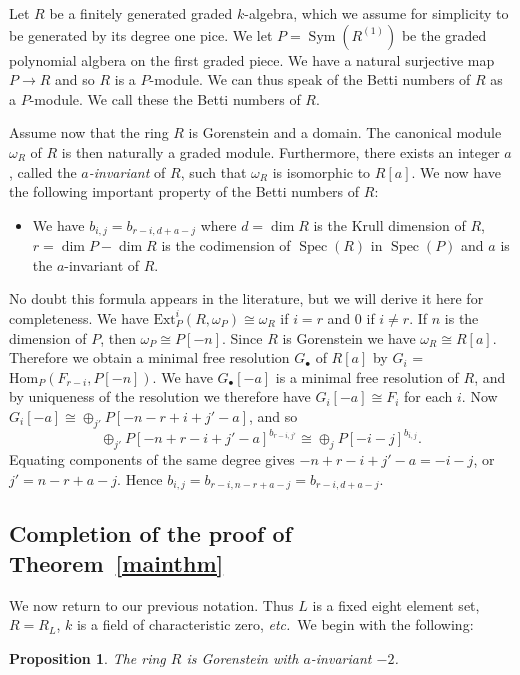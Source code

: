 \documentclass{amsart}
\newtheorem{proposition}[theorem]{Proposition}
\theoremstyle{definition}
\theoremstyle{remark}
\DeclareMathOperator{\Sym}{Sym}
\DeclareMathOperator{\Spec}{Spec}
\def\etc{{\it etc.}}
\begin{document}
Let $R$ be a finitely generated graded $k$-algebra, which we assume for
simplicity to be generated by its degree one pice.  We let $P=\Sym(R^{(1)})$
be the graded polynomial algbera on the first graded piece.  We have a
natural surjective map $P \to R$ and so $R$ is a $P$-module.  We can thus speak
of the Betti numbers of $R$ as a $P$-module.  We call these the Betti numbers
of $R$.

Assume now that the ring $R$ is Gorenstein and a domain.  The canonical module
$\omega_R$ of $R$ is then naturally a graded module.  Furthermore, there exists
an integer $a$, called the \emph{$a$-invariant} of $R$, such that $\omega_R$ is
isomorphic to $R[a]$.  We now have the following important property of the
Betti numbers of $R$:
\begin{itemize}
\item[(B6)] We have $b_{i, j}=b_{r-i, d+a-j}$ where $d=\dim{R}$ is the Krull
dimension of $R$, $r=\dim{P}-\dim{R}$ is the codimension of $\Spec(R)$ in
$\Spec(P)$ and $a$ is the $a$-invariant of $R$.
\end{itemize}
No doubt this formula appears in the literature, but we will derive it here for completeness.   
We have $\mathrm{Ext}^i_P(R, \omega_P) \cong \omega_R$ if 
$i = r$ and $0$ if $i \neq r$.   If $n$ is the dimension of $P$, then $\omega_P \cong P[-n]$.  Since $R$ is Gorenstein we have 
$\omega_R \cong R[a]$.
Therefore we obtain a minimal free resolution $G_\bullet$ of $R[a]$ 
by $G_i$  = $\mathrm{Hom}_P(F_{r-i}, P[-n])$.
We have $G_\bullet[-a]$ is a minimal free resolution of $R$, and by uniqueness of the resolution we therefore have $G_i[-a] \cong F_i$ for each $i$.  Now $G_i[-a] \cong \oplus_{j'} P[-n-r+i+j'-a]$, and so 
$$\oplus_{j'} P[-n+r-i+j'-a]^{b_{r-i,j'}} \cong \oplus_j P[-i-j]^{b_{i,j}}.$$
Equating components of the same degree gives $-n+r-i+j'-a = -i-j$, or 
$j' = n-r + a - j$.  Hence $b_{i,j} = b_{r-i, n-r+a-j} = b_{r-i, d+a-j}$.


\subsection{Completion of the proof of Theorem~\ref{mainthm}}
\label{s:betti}

We now return to our previous notation.  Thus $L$ is a fixed eight element set,
$R=R_L$, $k$ is a field of characteristic zero, \etc\ We begin with the
following:

\begin{proposition}
\label{prop:goren}
The ring $R$ is Gorenstein with $a$-invariant $-2$.
\end{proposition}
\end{document}
